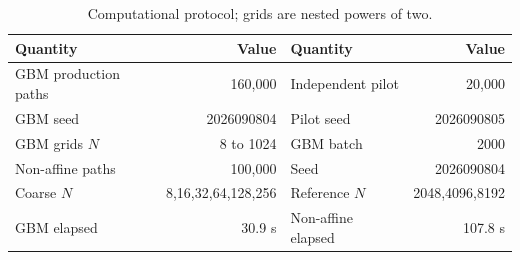 \begin{table}[H]\centering\small
\caption{Computational protocol; grids are nested powers of two.}
\begin{tabular}{lrlr}\toprule
Quantity & Value & Quantity & Value\\\midrule
GBM production paths & 160,000 & Independent pilot & 20,000\\
GBM seed & 2026090804 & Pilot seed & 2026090805\\
GBM grids $N$ & 8 to 1024 & GBM batch & 2000\\
Non-affine paths & 100,000 & Seed & 2026090804\\
Coarse $N$ & 8,16,32,64,128,256 & Reference $N$ & 2048,4096,8192\\
GBM elapsed & 30.9 s & Non-affine elapsed & 107.8 s\\
\bottomrule\end{tabular}
\end{table}
